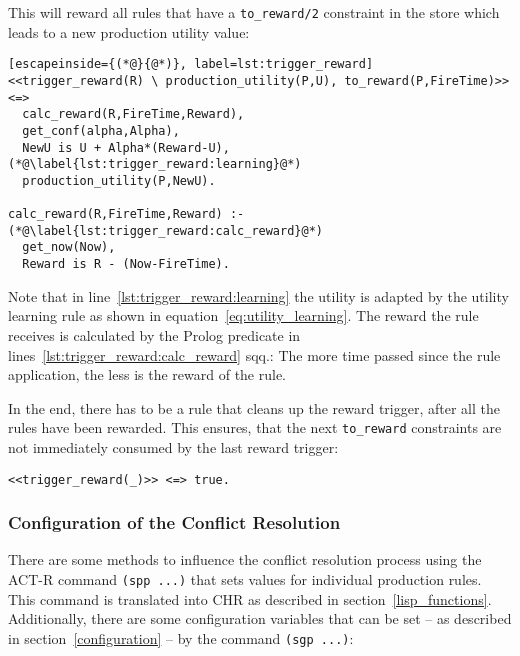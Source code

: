This will reward all rules that have a \lstinline|to_reward/2| constraint in the store which leads to a new production utility value:

\begin{lstlisting}[escapeinside={(*@}{@*)}, label=lst:trigger_reward]
<<trigger_reward(R) \ production_utility(P,U), to_reward(P,FireTime)>> <=>
  calc_reward(R,FireTime,Reward),
  get_conf(alpha,Alpha),
  NewU is U + Alpha*(Reward-U), (*@\label{lst:trigger_reward:learning}@*)
  production_utility(P,NewU).
  
calc_reward(R,FireTime,Reward) :- (*@\label{lst:trigger_reward:calc_reward}@*)
  get_now(Now),
  Reward is R - (Now-FireTime).
\end{lstlisting}

Note that in line~\ref{lst:trigger_reward:learning} the utility is adapted by the utility learning rule as shown in equation~\eqref{eq:utility_learning}. The reward the rule receives is calculated by the Prolog predicate in lines~\ref{lst:trigger_reward:calc_reward} sqq.: The more time passed since the rule application, the less is the reward of the rule.

In the end, there has to be a rule that cleans up the reward trigger, after all the rules have been rewarded. This ensures, that the next \lstinline|to_reward| constraints are not immediately consumed by the last reward trigger:

\begin{lstlisting}
<<trigger_reward(_)>> <=> true.
\end{lstlisting}

\subsubsection{Configuration of the Conflict Resolution}

There are some methods to influence the conflict resolution process using the ACT-R command \lstinline|(spp ...)| that sets values for individual production rules. This command is translated into CHR as described in section~\ref{lisp_functions}. Additionally, there are some configuration variables that can be set -- as described in section~\ref{configuration} -- by the command \lstinline|(sgp ...)|:

